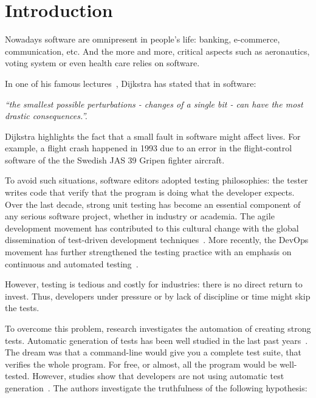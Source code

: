 \chapter{Introduction}
\label{chap:introduction}

\minitoc

\graphicspath{{.}{chapitres/introduction/}}

Nowadays software are omnipresent in people's life: banking, e-commerce, communication, etc. 
And the more and more, critical aspects such as aeronautics, voting system or even health care relies on software.

In one of his famous lectures~\cite{DijkstraLecture1989}, Dijkstra has stated that in software: 
\begin{center}
	\emph{``the smallest possible perturbations - \ie changes of a single bit - can have the most drastic consequences.''.}
\end{center}

Dijkstra highlights the fact that a small fault in software might affect lives.
For example, a flight crash happened in 1993 due to an error in the flight-control software of the the Swedish JAS 39 Gripen fighter aircraft.

To avoid such situations, software editors adopted testing philosophies: the tester writes code that verify that the program is doing what the developer expects.
Over the last decade, strong unit testing has become an essential component of any serious software project, whether in industry or academia.
The agile development movement has contributed to this cultural change with the global dissemination of test-driven development techniques~\cite{beck2003test}.
More recently, the DevOps movement has further strengthened the testing practice with an emphasis on continuous and automated testing~\cite{Roche2013Devops}.

However, testing is tedious and costly for industries: there is no direct return to invest.
Thus, developers under pressure or by lack of discipline or time might skip the tests.

To overcome this problem, research investigates the automation of creating strong tests.
Automatic generation of tests has been well studied in the last past years~\cite{ESECFSE11, PachecoE2005}.
The dream was that a command-line would give you a complete test suite, that verifies the whole program.
For free, or almost, all the program would be well-tested.
However, studies show that developers are not using automatic test generation~\cite{TOSEM_userstudy}.
The authors investigate the truthfulness of the following hypothesis:

